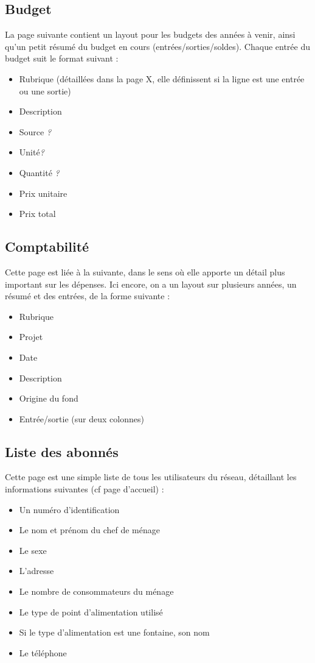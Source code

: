 \documentclass[a4paper, 11pt]{article}
\begin{document}
\subsection{Budget}

La page suivante contient un layout pour les budgets des années à venir, ainsi qu'un petit résumé du budget en cours (entrées/sorties/soldes). Chaque entrée du budget suit le format suivant :

\begin{itemize}
    \item Rubrique (détaillées dans la page X, elle définissent si la ligne est une entrée ou une sortie)
    \item Description
    \item Source \emph{?}
    \item Unité\emph{?}
    \item Quantité \emph{?}
    \item Prix unitaire
    \item Prix total
\end{itemize}

\subsection{Comptabilité}
Cette page est liée à la suivante, dans le sens où elle apporte un détail plus important sur les dépenses. Ici encore, on a un layout sur plusieurs années, un résumé et des entrées, de la forme suivante :

\begin{itemize}
    \item Rubrique
    \item Projet
    \item Date
    \item Description
    \item Origine du fond
    \item Entrée/sortie (sur deux colonnes)
\end{itemize}

\subsection{Liste des abonnés}
Cette page est une simple liste de tous les utilisateurs du réseau, détaillant les informations suivantes (cf page d'accueil) :
\begin{itemize}
        \item Un numéro d'identification
        \item Le nom et prénom du chef de ménage
        \item Le sexe
        \item L'adresse
        \item Le nombre de consommateurs du ménage
        \item Le type de point d'alimentation utilisé
        \item Si le type d'alimentation est une fontaine, son nom
        \item Le téléphone
    \end{itemize}
\end{document}

